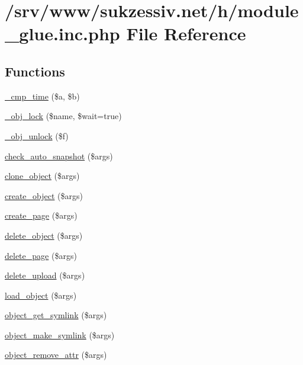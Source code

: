 \hypertarget{module__glue_8inc_8php}{
\section{/srv/www/sukzessiv.net/h/module\_\-glue.inc.php File Reference}
\label{module__glue_8inc_8php}
}
\subsection*{Functions}
\begin{CompactItemize}
\item 
\hyperlink{module__glue_8inc_8php_5fea6c120a24a298149febcbf3b1df10}{\_\-cmp\_\-time} (\$a, \$b)
\item 
\hyperlink{module__glue_8inc_8php_21f260355b875069ca90edf1f9a559d0}{\_\-obj\_\-lock} (\$name, \$wait=true)
\item 
\hyperlink{module__glue_8inc_8php_73a91facde5362e20df9657d31c2bb06}{\_\-obj\_\-unlock} (\$f)
\item 
\hyperlink{module__glue_8inc_8php_aa1103a091b9dbca790e77d25a452ca5}{check\_\-auto\_\-snapshot} (\$args)
\item 
\hyperlink{module__glue_8inc_8php_9c7f39d87787ce288ce3d8a3e389ba95}{clone\_\-object} (\$args)
\item 
\hyperlink{module__glue_8inc_8php_12aa18f28f86274d770ba90aa88e2c3e}{create\_\-object} (\$args)
\item 
\hyperlink{module__glue_8inc_8php_9806cd2a9b829a24876b149753e819fb}{create\_\-page} (\$args)
\item 
\hyperlink{module__glue_8inc_8php_51fdb1d1ff829d6d2d79a9f852b7e0ef}{delete\_\-object} (\$args)
\item 
\hyperlink{module__glue_8inc_8php_f11541a6869804225793b82e54fa09fe}{delete\_\-page} (\$args)
\item 
\hyperlink{module__glue_8inc_8php_a4865d52ac449f8aaadb3a5d425f2efb}{delete\_\-upload} (\$args)
\item 
\hyperlink{module__glue_8inc_8php_c6b5ed5ff055ccb4d07ad17cf78d5a11}{load\_\-object} (\$args)
\item 
\hyperlink{module__glue_8inc_8php_a9618d306b7ee5bd9e5d6a0be268ed44}{object\_\-get\_\-symlink} (\$args)
\item 
\hyperlink{module__glue_8inc_8php_14e6da411df5aa9ff38e2d4ea27dd077}{object\_\-make\_\-symlink} (\$args)
\item 
\hyperlink{module__glue_8inc_8php_e16d748c2d933978daec8bf11acdc34b}{object\_\-remove\_\-attr} (\$args)

\end{CompactItemize}
